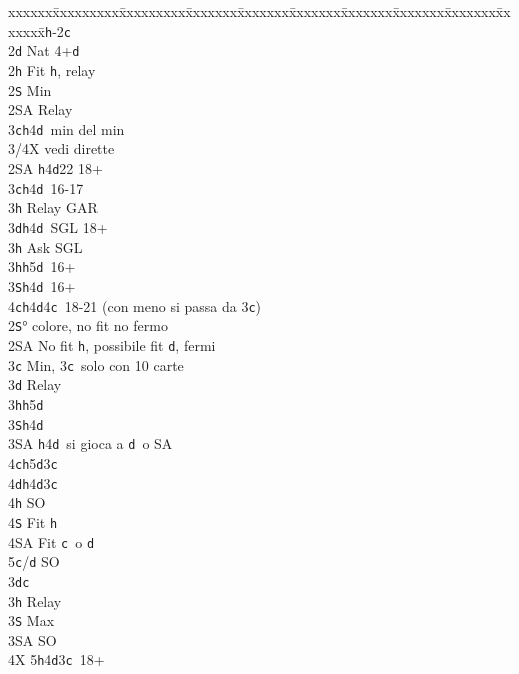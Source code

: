 \documentclass[a4paper,italian]{article}
\newcommand{\BS}{\small{\texttt{S}}}
\newcommand{\BC}{\small{\texttt{c}}}
\newcommand{\BD}{\small{\texttt{d}}}
\newcommand{\BH}{\small{\texttt{h}}}
\newenvironment{bidtable}
{\begin{tabbing}

    xxxxxx\=xxxxxxxxx\=xxxxxxxxx\=xxxxxxx\=xxxxxxx\=xxxxxxx\=xxxxxxx\=xxxxxxx\=xxxxxxx\=xxxxxxx\=\kill}
{\end{tabbing} }%
\begin{document}
\begin{multicols}{2}
    \begin{bidtable}
        1\BH-2\BC\\
        2\BD \> Nat 4+\BD \+\\
        2\BH \> Fit \BH , relay\+\\
        2\BS \> Min\+\\
        2\small{SA} \> Relay\+\\
        3\BC {}\BH 4\BD\ min del min\\
        3/4X \> vedi dirette\-\-\\
        2\small{SA} \BH 4\BD 22 18+\\
        3\BC {}\BH 4\BD\ 16-17\+\\
        3\BH \> Relay GAR\-\\
        3\BD {}\BH 4\BD\ SGL 18+\+\\
        3\BH \> Ask SGL\-\\
        3\BH {}\BH 5\BD\ 16+\\
        3\BS {}\BH 4\BD\ 16+\\
        4\BC {}\BH 4\BD 4\BC\ 18-21 (con meno si passa da 3\BC )\-\\
        2\BS {}° colore, no fit no fermo\\
        2\small{SA} \> No fit \BH , possibile fit \BD , fermi\+\\
        3\BC \> Min, 3\BC\ solo con 10 carte\+\\
        3\BD \> Relay\+\\
        3\BH {}\BH 5\BD \\
        3\BS {}\BH 4\BD \\
        3\small{SA} \BH 4\BD\ si gioca a \BD\ o SA\\
        4\BC {}\BH 5\BD 3\BC \\
        4\BD {}\BH 4\BD 3\BC \+\\
        4\BH \> SO\\
        4\BS \> Fit \BH \\
        4\small{SA} \> Fit \BC\ o \BD \\
        5\BC/\BD \> SO\-\-\-\\
        3\BD {}\BC \+\\
        3\BH \> Relay\+\\
        3\BS \> Max\+\\
        3\small{SA} \> SO\+\\
        4X 5\BH 4\BD 3\BC\ 18+\-\-\\

\end{bidtable}
\end{multicols}
\end{document}
